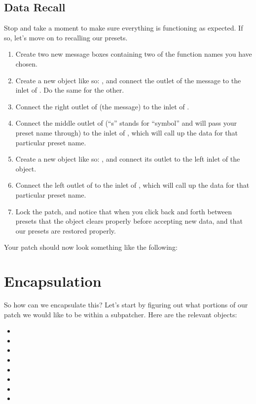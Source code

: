 \subsection{Data Recall}
Stop and take a moment to make sure everything is functioning as expected.  If so, let's move on to recalling our presets.

\begin{enumerate}
\item Create two new message boxes containing two of the function names you have chosen.
\item Create a new  object like so: , and connect the outlet of the  message to the inlet of .  Do the same for the other.
\item Connect the right outlet of  (the  message) to the inlet of .
\item Connect the middle outlet of  (``s'' stands for ``symbol'' and will pass your preset name through) to the inlet of , which will call up the data for that particular preset name.
\item Create a new  object like so: , and connect its outlet to the left inlet of the  object.
\item Connect the left outlet of  to the inlet of , which will call up the data for that particular preset name.
\item Lock the patch, and notice that when you click back and forth between presets that the  object clears properly before accepting new data, and that our presets are restored properly.
\end{enumerate}

Your patch should now look something like the following: 

\section{Encapsulation}\label{encapsulation}
So how can we encapsulate this?  Let's start by figuring out what portions of our patch we would like to be within a subpatcher.
Here are the relevant objects:  
\begin{itemize}
\item {}
\item {}
\item {}
\item {}
\item {}
\item {}
\item {}
\item {}
\end{itemize}

